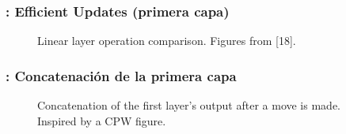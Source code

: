\begin{frame}
\frametitle{: \textbf{E}fficient \textbf{U}pdates (primera capa)}
\begin{figure}[H]
\centering
{}%
\qquad
{}%
\caption{Linear layer operation comparison. Figures from [18].}
\end{figure}
\end{frame}

\begin{frame}
\frametitle{: Concatenación de la primera capa}
\begin{figure}[H]
\centering
{}
\caption{Concatenation of the first layer's output after a move is made. Inspired by a CPW figure.}
\end{figure}
\end{frame}

